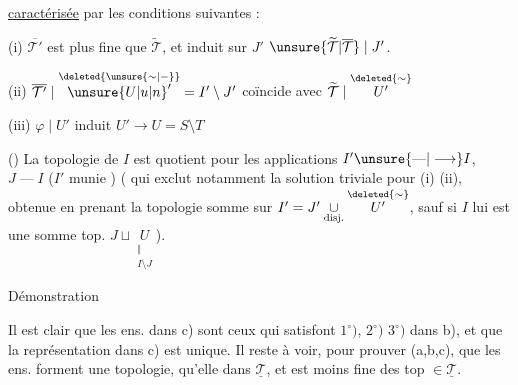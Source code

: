 \uline{caractérisée} par les conditions suivantes :

(i) $\overline{\mathcal{T}'}$ est plus fine que $\widetilde{\mathcal{T}}$, et induit sur $J'$ $\unsure{\widetilde{\mathcal{T}}|\overline{\mathcal{T}}}\mid J'$.

(ii) $\overline{\mathcal{T}'}\mid\overset{\deleted{\unsure{\sim|\mathord{-}}}}{{\unsure{U|u|n}}'}=I'\setminus J'$ coïncide avec $\widetilde{\mathcal{T}}\mid\overset{\deleted{\sim}}{U'}$

(iii) $\varphi\mid U'$ induit   $U'\longrightarrow U=S\setminus T$

() La topologie de $I$ est quotient  pour les applications $I'\unsure{\mathbin{\text{---}}|\longrightarrow}I$, $J\mathbin{\text{---}}I$ ($I'$ munie  ) ( qui exclut notamment la solution triviale pour (i) (ii), obtenue en prenant la topologie somme sur  $I'=J'\underset{\text{disj.}}{\cup}\overset{\deleted{\sim}}{U'}$, sauf si $I$ lui\unsure{$=$} est une somme top. $J\sqcup\underset{\substack{\Vert\\I\setminus J}}{U}$).

Démonstration

  Il est clair que les ens.  dans c) sont ceux qui satisfont $1^\circ)$, $2^\circ)$ $3^\circ)$ dans b), et que la représentation dans c) est unique. Il reste à voir, pour prouver (a,b,c), que les ens. forment une topologie,  qu'elle   dans $\underline{\mathcal{T}}$, et est moins fine des top $\in\underline{\mathcal{T}}$.

